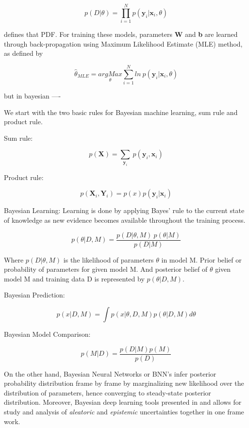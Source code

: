 \documentclass[11pt]{article}
\begin{document}
\begin{itemize}
	$$ p(D| \theta) = \prod_{i = 1}^{N}  p(\textbf{y}_{i} |\textbf{x}_{i}, \theta)  $$
	
	defines that PDF. For training these models, parameters \textbf{W} and 
	\textbf{b} are learned through back-propagation using Maximum Likelihood 
	Estimate (MLE) method, as defined by  
	
	$$ \hat{\theta}_{MLE} = \underset{\theta}{argMax} \sum_{i = 1}^{N} ln ~p(\textbf{y}_{i} | \textbf{x}_{i}, \theta) $$
	
	

	but in bayesian ---- 
	
	We start with the two basic rules for Bayesian machine learning, sum rule 
	and product rule.
	
	Sum rule: 
	
	$$ p(\textbf{X}) = \sum_{\textbf{y}_{i}}~ p(\textbf{y}_{i} ,\textbf{x}_{i})  $$  
	
	Product rule: 
	
	$$  p(\textbf{X}_{i}, \textbf{Y}_{i}) = p(x)p(\textbf{y}_{i}|\textbf{x}_{i}) $$ 
	
	
	Bayesian Learning: Learning is done by applying Bayes' rule to the current 
	state of knowledge as new evidence becomes available throughout the training
	 process. 

	$$ p(\theta | D, M) = \frac{p(D|\theta,M)~p(\theta|M)}{p(D|M)}  $$
	
	Where \( p(D| \theta, M) \) is the likelihood of parameters \( \theta \) in 
	model M. Prior belief or probability of parameters for given model M. And 
	posterior belief of \( \theta \) given model M and training data D is 
	represented by \( p(\theta | D, M) \).
	
	
	
	Bayesian Prediction: 
	
	$$ p(x| D, M) = \int p(x| \theta, D, M) p(\theta| D, M) d\theta $$
	
	Bayesian Model Comparison: 
	
	$$ p(M|D) = \frac{p(D|M)p(M)}{p(D)}$$ 
	
	On the other hand, Bayesian Neural Networks or BNN's infer posterior 
	probability distribution frame by frame by marginalizing new likelihood 
	over the distribution of parameters, hence converging to steady-state 
	posterior distribution. Moreover, Bayesian deep learning tools presented 
	in \cite{kendall2017uncertainties} and \cite{gal2016uncertainty} allows for 
	study and analysis of \textit{aleatoric} and \textit{epistemic} uncertainties 
	together in one frame work. 


\end{itemize}
\end{document}
